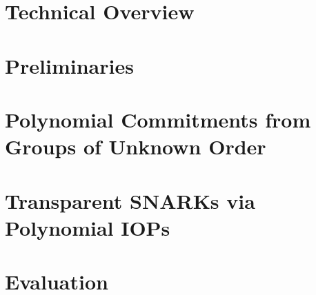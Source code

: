\documentclass[11pt]{article}
\theoremstyle{definition}
\begin{document}
\section{Technical Overview}

\section{Preliminaries}


\section{Polynomial Commitments from Groups of Unknown Order}
\label{sec:protocol}


\section{Transparent SNARKs via Polynomial IOPs}\label{sec:polyiop}


\section{Evaluation}

\end{document}
